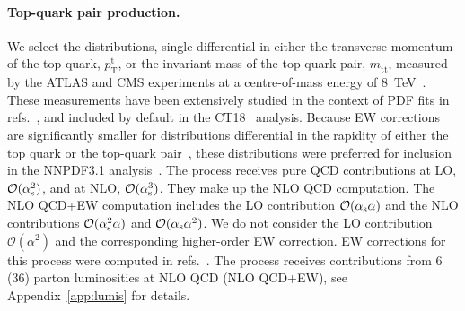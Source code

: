 \paragraph{Top-quark pair production.}
We select the distributions, single-differential in either the transverse
momentum of the top quark, $p_\mathrm{T}^\mathrm{t}$, or the invariant mass of the top-quark
pair, $m_{\mathrm{t}\bar{\mathrm{t}}}$, measured by the ATLAS and CMS experiments at a centre-of-mass
energy of \SI{8}{\tera\electronvolt}~\cite{Aad:2015mbv,Khachatryan:2015oqa}. These measurements have
been extensively studied in the context of PDF fits in
refs.~\cite{Czakon:2016olj,Bailey:2019yze,Amoroso:2020lgh,Kadir:2020yml}, and
included by default in the CT18~\cite{Hou:2019efy} analysis.
Because EW corrections are significantly smaller for distributions differential
in the rapidity of either the top quark or the top-quark
pair~\cite{Czakon:2017wor}, these distributions were preferred for inclusion
in the NNPDF3.1 analysis~\cite{Ball:2017nwa}. The process receives
pure QCD contributions at LO, $\mathcal{O}(\alpha_\mathrm{s}^2)$, and
at NLO, $\mathcal{O}(\alpha_\mathrm{s}^3)$. They make up the NLO QCD
computation. The NLO QCD+EW computation includes the LO contribution
$\mathcal{O}(\alpha_\mathrm{s}\alpha)$ and the NLO contributions
$\mathcal{O}(\alpha_\mathrm{s}^2\alpha)$ and $\mathcal{O}(\alpha_\mathrm{s}\alpha^2)$.
We do not consider the LO contribution $\mathcal{O}(\alpha^2)$ and the
corresponding higher-order EW correction. EW corrections for this process
were computed in refs.~\cite{Bernreuther:2010ny,Hollik:2011ps,Kuhn:2011ri,Bernreuther:2012sx,Pagani:2016caq,Czakon:2017wor,Czakon:2017lgo,Czakon:2017mmr,Czakon:2019bcq,Czakon:2019txp}. The process receives contributions from
6 (36) parton luminosities at NLO QCD (NLO QCD+EW),
see Appendix~\ref{app:lumis} for details.

